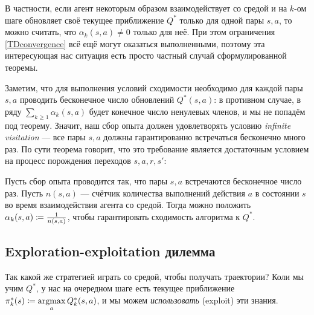 В частности, если агент некоторым образом взаимодействует со средой и на $k$-ом шаге обновляет своё текущее приближение $Q^*$ только для одной пары $s, a$, то можно считать, что $\alpha_k(s, a) \ne 0$ только для неё. При этом ограничения \eqref{TDconvergence} всё ещё могут оказаться выполненными, поэтому эта интересующая нас ситуация есть просто частный случай сформулированной теоремы.

Заметим, что для выполнения условий сходимости необходимо для каждой пары $s, a$ проводить бесконечное число обновлений $Q^*(s, a)$: в противном случае, в ряду $\sum\limits_{k \ge 1} \alpha_k(s, a)$ будет конечное число ненулевых членов, и мы не попадём под теорему. Значит, наш сбор опыта должен удовлетворять условию \emph{infinite visitation} --- все пары $s, a$ должны гарантированно встречаться бесконечно много раз. По сути теорема говорит, что это требование является достаточным условием на процесс порождения переходов $s, a, r, s'$:

\begin{proposition}\label{infinitepairsisenough}
Пусть сбор опыта проводится так, что пары $s, a$ встречаются бесконечное число раз. Пусть $n(s, a)$ --- счётчик количества выполнений действия $a$ в состоянии $s$ во время взаимодействия агента со средой. Тогда можно положить $\alpha_k(s, a) \HM\coloneqq \frac{1}{n(s, a)}$, чтобы гарантировать сходимость алгоритма к $Q^*$.
\end{proposition}

\subsection{Exploration-exploitation дилемма}

Так какой же стратегией играть со средой, чтобы получать траектории? Коли мы учим $Q^*$, у нас на очередном шаге есть текущее приближение $\pi^*_k(s) \HM\coloneqq \argmax\limits_a Q^*_k(s, a)$, и мы можем \emph{использовать} (exploit) эти знания.

